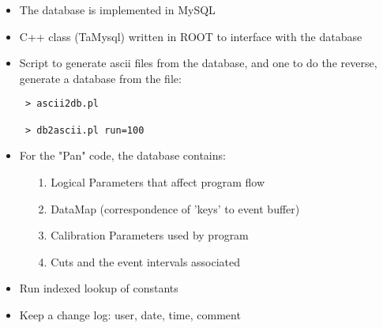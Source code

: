 \begin{slide*}

\centerline{}
{\Large 

\begin{itemize}
\item  The database is implemented in MySQL

{}

\item C++ class (TaMysql) written in ROOT to 
interface with the database

{}

\item Script to generate ascii files from the database, and one
to do the reverse, generate a database from the file: 

\begin{verbatim}
 > ascii2db.pl 

 > db2ascii.pl run=100
\end{verbatim}

\end{itemize}
}

\end{slide*}

\begin{slide*}

\centerline{}
{\Large 
\begin{itemize}
\item  For the "Pan" code, the database contains:

\begin{itemize}
     \item[1.] Logical Parameters that affect program flow
     \item[2.] DataMap (correspondence of 'keys' to event buffer)
     \item[3.] Calibration Parameters used by program
     \item[4.] Cuts and the event intervals associated
\end{itemize}

\item Run indexed lookup of constants

\item Keep a change log: user, date, time, comment

\end{itemize}
}

\end{slide*}

